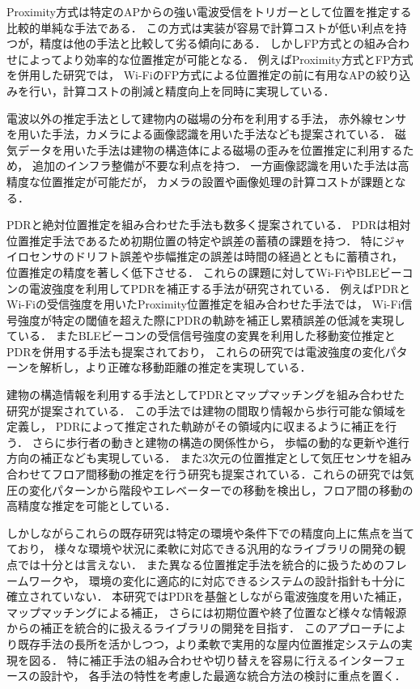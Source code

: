 Proximity方式は特定のAPからの強い電波受信をトリガーとして位置を推定する比較的単純な手法である．
この方式は実装が容易で計算コストが低い利点を持つが，精度は他の手法と比較して劣る傾向にある．
しかしFP方式との組み合わせによってより効率的な位置推定が可能となる．
例えばProximity方式とFP方式を併用した研究\cite{proximity-fingerprint}では，
Wi-FiのFP方式による位置推定の前に有用なAPの絞り込みを行い，計算コストの削減と精度向上を同時に実現している．

電波以外の推定手法として建物内の磁場の分布を利用する手法\cite{pdr-mag}，
赤外線センサを用いた手法\cite{infrared}，カメラによる画像認識を用いた手法\cite{camera}なども提案されている．
磁気データを用いた手法は建物の構造体による磁場の歪みを位置推定に利用するため，
追加のインフラ整備が不要な利点を持つ．
一方画像認識を用いた手法は高精度な位置推定が可能だが，
カメラの設置や画像処理の計算コストが課題となる．

PDRと絶対位置推定を組み合わせた手法も数多く提案されている．
PDRは相対位置推定手法であるため初期位置の特定や誤差の蓄積の課題を持つ．
特にジャイロセンサのドリフト誤差や歩幅推定の誤差は時間の経過とともに蓄積され，
位置推定の精度を著しく低下させる．
これらの課題に対してWi-FiやBLEビーコンの電波強度を利用してPDRを補正する手法が研究されている．
例えばPDRとWi-Fiの受信強度を用いたProximity位置推定を組み合わせた手法\cite{pdr-wifi}では，
Wi-Fi信号強度が特定の閾値を超えた際にPDRの軌跡を補正し累積誤差の低減を実現している．
またBLEビーコンの受信信号強度の変異を利用した移動変位推定とPDRを併用する手法\cite{pdr-ble}も提案されており，
これらの研究では電波強度の変化パターンを解析し，より正確な移動距離の推定を実現している．

建物の構造情報を利用する手法としてPDRとマップマッチングを組み合わせた研究\cite{pdr-map}が提案されている．
この手法では建物の間取り情報から歩行可能な領域を定義し，
PDRによって推定された軌跡がその領域内に収まるように補正を行う．
さらに歩行者の動きと建物の構造の関係性から，
歩幅の動的な更新や進行方向の補正なども実現している．
また3次元の位置推定として気圧センサを組み合わせてフロア間移動の推定を行う研究\cite{pdr-wifi}\cite{pdr-stable}も提案されている．これらの研究では気圧の変化パターンから階段やエレベーターでの移動を検出し，フロア間の移動の高精度な推定を可能としている．

しかしながらこれらの既存研究は特定の環境や条件下での精度向上に焦点を当てており，
様々な環境や状況に柔軟に対応できる汎用的なライブラリの開発の観点では十分とは言えない．
また異なる位置推定手法を統合的に扱うためのフレームワークや，
環境の変化に適応的に対応できるシステムの設計指針も十分に確立されていない．
本研究ではPDRを基盤としながら電波強度を用いた補正，マップマッチングによる補正，
さらには初期位置や終了位置など様々な情報源からの補正を統合的に扱えるライブラリの開発を目指す．
このアプローチにより既存手法の長所を活かしつつ，より柔軟で実用的な屋内位置推定システムの実現を図る．
特に補正手法の組み合わせや切り替えを容易に行えるインターフェースの設計や，
各手法の特性を考慮した最適な統合方法の検討に重点を置く．


